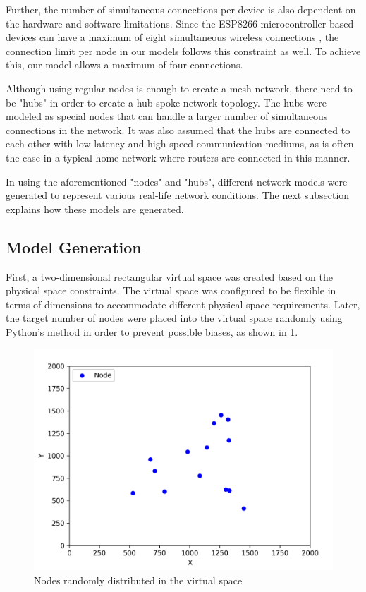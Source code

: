 Further, the number of simultaneous connections per device is also dependent on the hardware and software limitations. Since the ESP8266 microcontroller-based devices can have a maximum of eight simultaneous wireless connections \cite{ESP8266_NONOS_V1_1_0_Release_Notes}, the connection limit per node in our models follows this constraint as well. To achieve this, our model allows a maximum of four connections.

Although using regular nodes is enough to create a mesh network, there need to be "hubs" in order to create a hub-spoke network topology. The hubs were modeled as special nodes that can handle a larger number of simultaneous connections in the network. It was also assumed that the hubs are connected to each other with low-latency and high-speed communication mediums, as is often the case in a typical home network where routers are connected in this manner. 

In using the aforementioned "nodes" and "hubs", different network models were generated to represent various real-life network conditions. The next subsection explains how these models are generated.


\newpage
\subsection{Model Generation}
\label{model-gen-section}
First, a two-dimensional rectangular virtual space was created based on the physical space constraints. The virtual space was configured to be flexible in terms of dimensions to accommodate different physical space requirements. Later, the target number of nodes were placed into the virtual space randomly using Python's  method in order to prevent possible biases, as shown in \ref{fig:modeling_node}.

\begin{figure}[H]
    \centering
    \includegraphics[width=0.42\columnwidth]{images/modeling_nodes_only.png}
    \caption{Nodes randomly distributed in the virtual space}
    \label{fig:modeling_node}
\end{figure}


